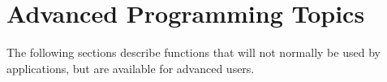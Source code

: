 %
\section{Advanced Programming Topics}
\label{advanced-topics}

The following sections describe functions that will not normally be
used by applications, but are available for advanced users.









